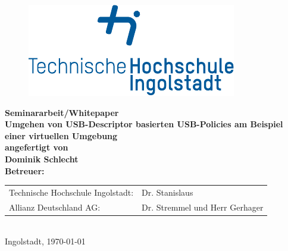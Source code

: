 
\begin{titlepage}

\phantom{tmpText}

\vspace{1cm}

\begin{figure}[h!]
\centering
\includegraphics[width=\textwidth]{bilder/thi_logo_cropped.pdf}
\end{figure}

  \begin{center}

    
    
    \textbf{{\large Seminararbeit/Whitepaper} \\[3ex]
    {\LARGE Umgehen von USB-Descriptor basierten USB-Policies am Beispiel einer virtuellen Umgebung} \\[1ex]
    \vfill
    angefertigt von \\
    Dominik Schlecht \\[2ex] %
    \vfill
    Betreuer:} \\%
    \begin{tabular}{ll}
      Technische Hochschule Ingolstadt: & Dr. Stanislaus \\
      Allianz Deutschland AG: & Dr. Stremmel und Herr Gerhager
    \end{tabular} \\[2ex]
    \vfill
    Ingolstadt, \today
  \end{center}
\end{titlepage}
